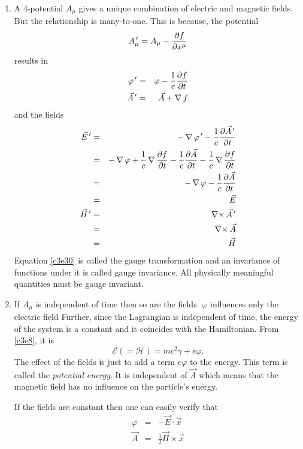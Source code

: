 \begin{enumerate}
\item A 4-potential $A_\mu$ gives a unique combination of electric and magnetic
fields. But the relationship is many-to-one. This is because, the potential
\begin{equation}\label{c3e30}
A_\mu^{\,\prime} = A_\mu - \frac{\partial{f}}{\partial{x^\mu}}
\end{equation}
results in
\begin{eqnarray}
\varphi^{\,\prime} &=& \varphi - \frac{1}{c}\frac{\partial{f}}{\partial{t}} \label{c3e31} \\
\vec{A}^{\,\prime} &=& \vec{A} + \operatorname{\nabla} f \label{c3e32}
\end{eqnarray}
and the fields
\begin{eqnarray}
\vec{E}^{\,\prime} &=& 
	-\operatorname{\nabla}{\varphi^{\,\prime}} - \frac{1}{c}\frac{\partial{\vec{A}^{\,\prime}}}{\partial{t}} \nonumber \\
 &=& -\operatorname{\nabla}\varphi + \frac{1}{c}\operatorname{\nabla}\frac{\partial{f}}{\partial{t}} - 
      \frac{1}{c}\frac{\partial{\vec{A}}}{\partial{t}} - \frac{1}{c}\operatorname{\nabla}{\frac{\partial{f}}{\partial{t}}} \nonumber \\
 &=& -\operatorname{\nabla}\varphi - \frac{1}{c}\frac{\partial{\vec{A}}}{\partial{t}} \nonumber \\
 &=& \vec{E} \label{c3e33} \\
\vec{H}^{\,\prime} &=& \operatorname{\nabla\times}\vec{A}^{\,\prime} \nonumber \\
 &=& \operatorname{\nabla\times}\vec{A} \nonumber \\
 &=& \vec{H} \label{c3e34}
\end{eqnarray}
Equation \eqref{c3e30} is called the gauge transformation and an invariance of
functions under it is called gauge invariance. All physically meaningful 
quantities must be gauge invariant.

\item If $A_\mu$ is independent of time then so are the fields. $\varphi$
influences only the electric field Further, since the Lagrangian is 
independent of time, the energy of the system is a constant and it coincides 
with the Hamiltonian. From
\eqref{c3e8}, it is
\begin{equation}\label{c3e35}
\mathcal{E} (= \mathcal{H}) = mc^2\gamma + e\varphi.
\end{equation} 
The effect of the fields is just to add a term $e\varphi$ to the energy. This 
term is called the \emph{potential energy}. It is independent of $\vec{A}$ 
which means that the magnetic field has no influence on the particle's energy.

If the fields are constant then one can easily verify that
\begin{eqnarray}
\varphi &=& -\vec{E}\cdot\vec{x} \label{c3e36} \\
\vec{A} &=& \frac{1}{2}\vec{H} \times \vec{x} \label{c3e37}
\end{eqnarray}


\end{enumerate}
